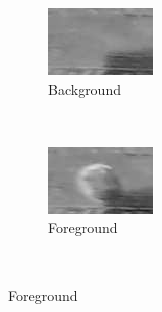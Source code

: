 \documentclass{physics_article_B}
\begin{document}
        \begin{figure}[H]
            \centering
            \begin{subfigure}[b]{0.3\textwidth}
                \includegraphics[width=\textwidth]{Figures/DropFinder1.eps}
                \caption{Background}
                \label{fig:detector:back}
            \end{subfigure}
            ~ %
            \begin{subfigure}[b]{0.3\textwidth}
                \includegraphics[width=\textwidth]{Figures/DropFinder2.eps}
                \caption{Foreground}
                \label{fig:detector:fore}
            \end{subfigure}
            ~ %

\end{figure}
\end{document}
